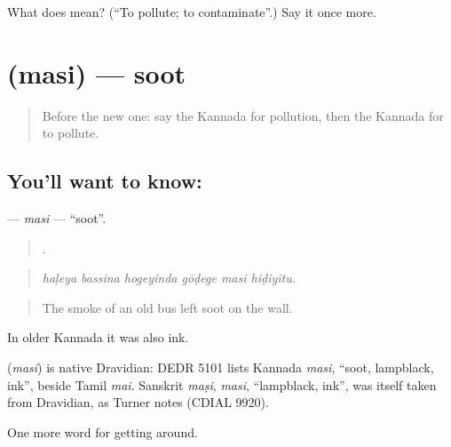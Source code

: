 \begin{tcolorbox}[breakable,colback=teal!4,colframe=teal!35!black,title={Before you move on}]
What does  mean? (\textquotedblleft{}To pollute; to contaminate\textquotedblright{}.) Say it once more.
\end{tcolorbox}
\section[\texorpdfstring{\kn{ಮಸಿ} (masi)}{ಮಸಿ (masi)}]{ (masi) — soot}

\label{lesson:KA-C473-masi}



\begin{quote}
Before the new one: say the Kannada for pollution, then the Kannada for to pollute.
\end{quote}

\subsection*{You'll want to know: }
\textbf{} — \emph{masi} — \textquotedblleft{}soot\textquotedblright{}.

\begin{quote}
     .
\end{quote}

\begin{quote}
\emph{haḷeya bassina hogeyinda gōḍege masi hiḍiyitu.}
\end{quote}

\begin{quote}
The smoke of an old bus left soot on the wall.
\end{quote}

In older Kannada it was also ink.

\begin{cousinweb}
\textbf{} (\emph{masi}) is native Dravidian: DEDR 5101 lists Kannada \emph{masi}, \textquotedblleft{}soot, lampblack, ink\textquotedblright{}, beside Tamil \emph{mai}. Sanskrit \emph{maṣi}, \emph{masi}, \textquotedblleft{}lampblack, ink\textquotedblright{}, was itself taken from Dravidian, as Turner notes (CDIAL 9920).
\end{cousinweb}

\begin{grammarlens}[title={What you've built}]
One more word for getting around.
\end{grammarlens}

